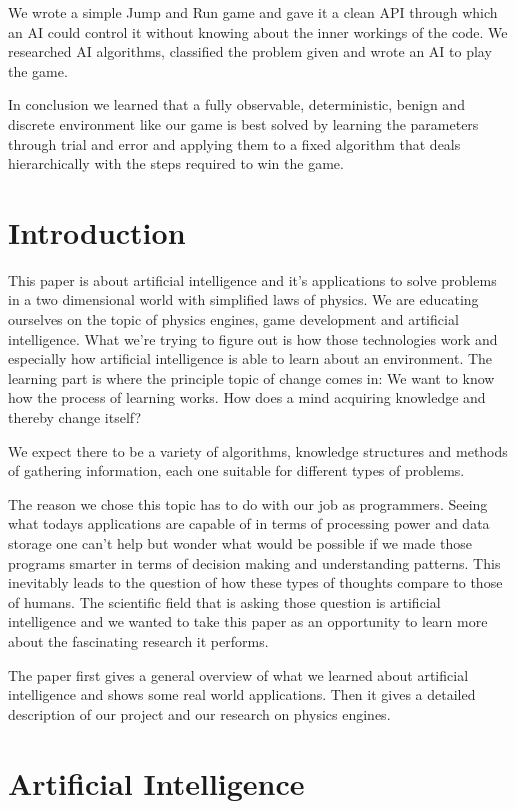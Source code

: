 We wrote a simple Jump and Run game and gave it a clean API through which an AI could control it without knowing about the inner workings of the code. We researched AI algorithms, classified the problem given and wrote an AI to play the game.

In conclusion we learned that a fully observable, deterministic, benign and discrete environment like our game is best solved by learning the parameters through trial and error and applying them to a fixed algorithm that deals hierarchically with the steps required to win the game.

\chapter{Introduction}

This paper is about artificial intelligence and it's applications to solve problems in a two dimensional world with simplified laws of physics. We are educating ourselves on the topic of physics engines, game development and artificial intelligence. What we're trying to figure out is how those technologies work and especially how artificial intelligence is able to learn about an environment. The learning part is where the principle topic of change comes in: We want to know how the process of learning works. How does a mind acquiring knowledge and thereby change itself?

We expect there to be a variety of algorithms, knowledge structures and methods of gathering information, each one suitable for different types of problems.

The reason we chose this topic has to do with our job as programmers. Seeing what todays applications are capable of in terms of processing power and data storage one can't help but wonder what would be possible if we made those programs smarter in terms of decision making and understanding patterns. This inevitably leads to the question of how these types of thoughts compare to those of humans. The scientific field that is asking those question is artificial intelligence and we wanted to take this paper as an opportunity to learn more about the fascinating research it performs.

The paper first gives a general overview of what we learned about artificial intelligence and shows some real world applications. Then it gives a detailed description of our project and our research on physics engines.

\chapter{Artificial Intelligence}
